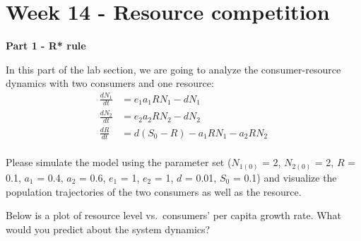 \documentclass[
]{book}
\begin{document}
\hypertarget{week-14---resource-competition}{%
\chapter*{Week 14 - Resource competition}\label{week-14---resource-competition}}

\textbf{Part 1 - R* rule}

In this part of the lab section, we are going to analyze the consumer-resource dynamics with two consumers and one resource:
\begin{align*}
\frac {dN_{1}}{dt} &= e_{1}a_{1}RN_{1}-dN_{1}\\
\frac {dN_{2}}{dt} &= e_{2}a_{2}RN_{2}-dN_{2}\\
\frac {dR}{dt} &= d(S_{0}-R)-a_{1}RN_{1}-a_{2}RN_{2}\\
\end{align*}

Please simulate the model using the parameter set (\(N_{1(0)}\) = 2, \(N_{2(0)}\) = 2, \(R\) = 0.1, \(a_1\) = 0.4, \(a_2\) = 0.6, \(e_1\) = 1, \(e_2\) = 1, \(d\) = 0.01, \(S_0\) = 0.1) and visualize the population trajectories of the two consumers as well as the resource.

Below is a plot of resource level vs.~consumers' per capita growth rate. What would you predict about the system dynamics?
\end{document}
